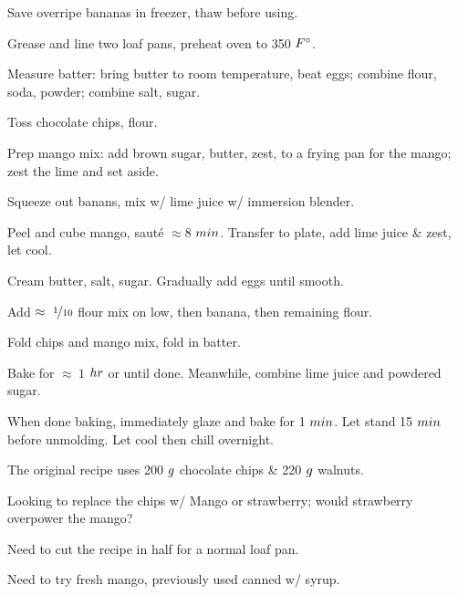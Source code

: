 \begin{preparation}
\item Save overripe bananas in freezer, thaw before using.

\item Grease and line two loaf pans, preheat oven to 350 $\Fahrenheit$.

\item Measure batter: bring butter to room temperature, beat eggs; combine flour, soda, powder; combine salt, sugar.

\item Toss chocolate chips, flour.

\item Prep mango mix: add brown sugar, butter, zest, to a frying pan for the mango;
	zest the lime and set aside.

\item Squeeze out banans, mix w/ lime juice w/ immersion blender.

\item Peel and cube mango, saut\'{e} $\approx 8$ $\minute$.
	Transfer to plate, add lime juice \& zest, let cool.

\item Cream butter, salt, sugar.
	Gradually add eggs until smooth.

\item Add $\approx~\onetenth$ flour mix on low, then banana, then remaining flour.

\item Fold chips and mango mix, fold in batter.

\item Bake for $\approx~1$ $\hour$ or until done.
	Meanwhile, combine lime juice and powdered sugar.

\item When done baking, immediately glaze and bake for 1 $\minute$.
	Let stand 15 $\minute$ before unmolding.
	Let cool then chill overnight.
\end{preparation}

\begin{variation}
\item The original recipe uses 200 $\gram$ chocolate chips \& 220 $\gram$ walnuts.
\end{variation}


\begin{experiments}
\item Looking to replace the chips w/ Mango or strawberry; would strawberry overpower the mango?
\item Need to cut the recipe in half for a normal loaf pan.
\item Need to try fresh mango, previously used canned w/ syrup.
\end{experiments}


\recipeend%
